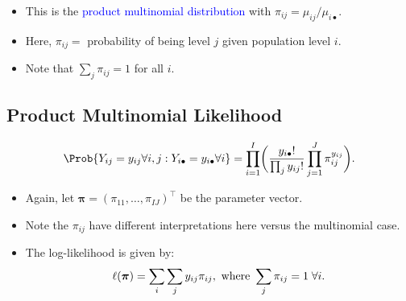 \documentclass{article}\usepackage[]{graphicx}\usepackage[svgnames]{xcolor}
\providecommand\given{} %
\renewcommand\given{\nonscript\:\delimsize\vert\nonscript\:\mathopen{}}%
\renewcommand\given{\nonscript\:\delimsize\vert\nonscript\:\mathopen{}}%
\renewcommand\given{\nonscript\:\delimsize\vert\nonscript\:\mathopen{}}%
\renewcommand\given{\nonscript\:\delimsize\vert\nonscript\:\mathopen{}}%
\renewcommand\given{\nonscript\:\delimsize\vert\nonscript\:\mathopen{}}%
\renewcommand\given{\nonscript\:\delimsize\vert\nonscript\:\mathopen{}}%
\renewcommand\given{\nonscript\:\delimsize\vert\nonscript\:\mathopen{}}%
\renewcommand\given{\nonscript\:\delimsize\vert\nonscript\:\mathopen{}}%
\renewcommand\given{\nonscript\:\delimsize\vert\nonscript\:\mathopen{}}%
\renewcommand\given{\nonscript\:\delimsize\vert\nonscript\:\mathopen{}}%
\renewcommand\given{\nonscript\:\delimsize\vert\nonscript\:\mathopen{}}%
\let\log\relax%
\renewcommand\given{:}
\providecommand{\Vector}[1]{\bm{#1}}%
\begin{document}
\begin{itemize}
      \item This is the \textcolor{Blue}{product multinomial distribution} with $ \pi_{ij}=\mu_{ij}/\mu_{i\bullet} $.
      \item Here, $ \pi_{ij}= $ probability of being level $j$ given population level $i$.
      \item Note that $ \sum_j \pi_{ij}=1 $ for all $ i $.
\end{itemize}
\subsection*{Product Multinomial Likelihood}
\[ \Prob{Y_{ij}=y_{ij}\forall i,j\given Y_{i\bullet}=y_{i\bullet}\forall i}=
      \prod_{i=1}^I\biggl(\frac{y_{i\bullet}!}{\prod_j y_{ij}!}\prod_{j=1}^J \pi_{ij}^{y_{ij}}\biggr). \]
\begin{itemize}
      \item Again, let $ \Vector{\pi}=(\pi_{11},\ldots,\pi_{IJ})^\top $ be the parameter vector.
      \item Note the $ \pi_{ij} $ have different interpretations here versus the multinomial case.
      \item The log-likelihood is given by:
            \[ \ell(\Vector{\pi})=\sum_i\sum_j y_{ij}\log{\pi_{ij}},\text{ where }\sum_j \pi_{ij}=1\;\forall i. \]
\end{itemize}
\end{document}

